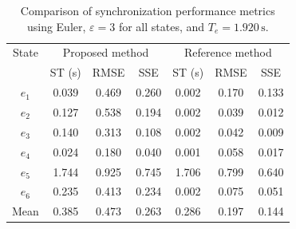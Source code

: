 \begin{table}[!t]
\centering
\caption{Comparison of synchronization performance metrics using Euler, $\varepsilon=3$ for all states, and $T_e=1.920\,\mathrm{s}$.}
\renewcommand{\arraystretch}{1.15}
\begin{tabular}{c|ccc|ccc}
\hline
State & \multicolumn{3}{c|}{Proposed method} & \multicolumn{3}{c}{Reference method} \\
 & ST (s) & RMSE & SSE & ST (s) & RMSE & SSE \\
\hline
$e_1$ & 0.039 & 0.469 & 0.260 & 0.002 & 0.170 & 0.133 \\
$e_2$ & 0.127 & 0.538 & 0.194 & 0.002 & 0.039 & 0.012 \\
$e_3$ & 0.140 & 0.313 & 0.108 & 0.002 & 0.042 & 0.009 \\
$e_4$ & 0.024 & 0.180 & 0.040 & 0.001 & 0.058 & 0.017 \\
$e_5$ & 1.744 & 0.925 & 0.745 & 1.706 & 0.799 & 0.640 \\
$e_6$ & 0.235 & 0.413 & 0.234 & 0.002 & 0.075 & 0.051 \\
Mean & 0.385 & 0.473 & 0.263 & 0.286 & 0.197 & 0.144 \\
\hline
\end{tabular}
\end{table}
